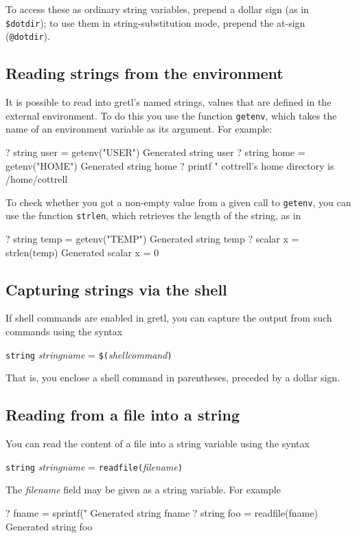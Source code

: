 To access these as ordinary string variables, prepend a dollar sign
(as in \verb|$dotdir|); to use them in string-substitution mode,
prepend the at-sign (\verb|@dotdir|).

\subsection{Reading strings from the environment}

It is possible to read into gretl's named strings, values that are
defined in the external environment.  To do this you use the function
\texttt{getenv}, which takes the name of an environment variable as
its argument.  For example:
%
\begin{code}
? string user = getenv("USER")
Generated string user
? string home = getenv("HOME")
Generated string home
? printf "%
cottrell's home directory is /home/cottrell
\end{code}
%
To check whether you got a non-empty value from a given call to
\texttt{getenv}, you can use the function \texttt{strlen}, which
retrieves the length of the string, as in
%
\begin{code}
? string temp = getenv("TEMP")
Generated string temp
? scalar x = strlen(temp)
Generated scalar x = 0
\end{code}

\subsection{Capturing strings via the shell}

If shell commands are enabled in gretl, you can capture the
output from such commands using the syntax 

\texttt{string} \textsl{stringname} = \texttt{\$(}\textsl{shellcommand}\texttt{)}

That is, you enclose a shell command in parentheses, preceded by
a dollar sign.

\subsection{Reading from a file into a string}

You can read the content of a file into a string variable using
the syntax

\texttt{string} \textsl{stringname} = \texttt{readfile(}\textsl{filename}\texttt{)}

The \textsl{filename} field may be given as a string variable.  For
example
%
\begin{code}
? fname = sprintf("%
Generated string fname
? string foo = readfile(fname)
Generated string foo
\end{code}

